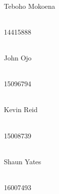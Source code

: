 \documentclass[12pt]{article}
\begin{document}
\begin{titlepage}
\begin{center}
		\begin{minipage}{0.4\textwidth}
			\begin{flushleft} \large
				\emph{} \\
				Teboho {Mokoena}
			\end{flushleft}
		\end{minipage}
		\begin{minipage}{0.4\textwidth}
			\begin{flushright} \large
				\emph{} \\
				14415888
			\end{flushright}
		\end{minipage}

		\begin{minipage}{0.4\textwidth}
			\begin{flushleft} \large
				\emph{} \\
				John {Ojo}
			\end{flushleft}
		\end{minipage}
		\begin{minipage}{0.4\textwidth}
			\begin{flushright} \large
				\emph{} \\
				15096794
			\end{flushright}
		\end{minipage}

        \begin{minipage}{0.4\textwidth}
			\begin{flushleft} \large
				\emph{} \\
				Kevin {Reid}
			\end{flushleft}
		\end{minipage}
		\begin{minipage}{0.4\textwidth}
			\begin{flushright} \large
				\emph{} \\
				15008739
			\end{flushright}
		\end{minipage}

        \begin{minipage}{0.4\textwidth}
			\begin{flushleft} \large
				\emph{} \\
				Shaun {Yates}
			\end{flushleft}
		\end{minipage}
		\begin{minipage}{0.4\textwidth}
			\begin{flushright} \large
				\emph{} \\
				16007493
			\end{flushright}
		\end{minipage}


\end{center}
\end{titlepage}
\end{document}
